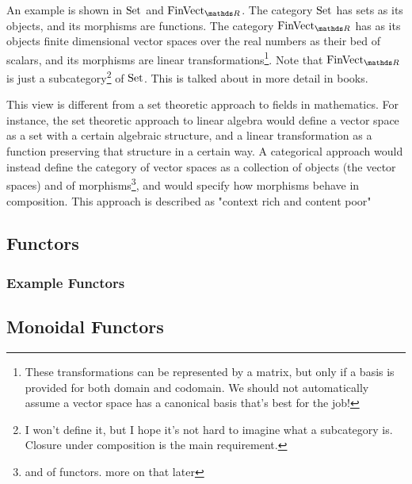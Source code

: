 
An example is shown in $\mathrm{Set}$ and $\FinVect$.
The category $\mathrm{Set}$ has sets as its objects, and its morphisms are functions.
The category $\FinVect$ has as its objects finite dimensional vector spaces over the real numbers as their bed of scalars, and its morphisms are linear transformations\footnote{These transformations can be represented by a matrix, but only if a basis is provided for both domain and codomain. We should not automatically assume a vector space has a canonical basis that's best for the job!}.
Note that $\FinVect$ is just a subcategory\footnote{I won't define it, but I hope it's not hard to imagine what a subcategory is. Closure under composition is the main requirement.} of $\mathrm{Set}$. This is talked about in more detail in books.

This view is different from a set theoretic approach to fields in mathematics.
For instance, the set theoretic approach to linear algebra would define a vector space as a set with a certain algebraic structure, and a linear transformation as a function preserving that structure in a certain way.
A categorical approach would instead define the category of vector spaces as a collection of objects (the vector spaces) and of morphisms\footnote{and of functors. more on that later}, and would specify how morphisms behave in composition.
This approach is described as "context rich and content poor"


\subsection{Functors}
\subsubsection{Example Functors}
\subsection{Monoidal Functors}
